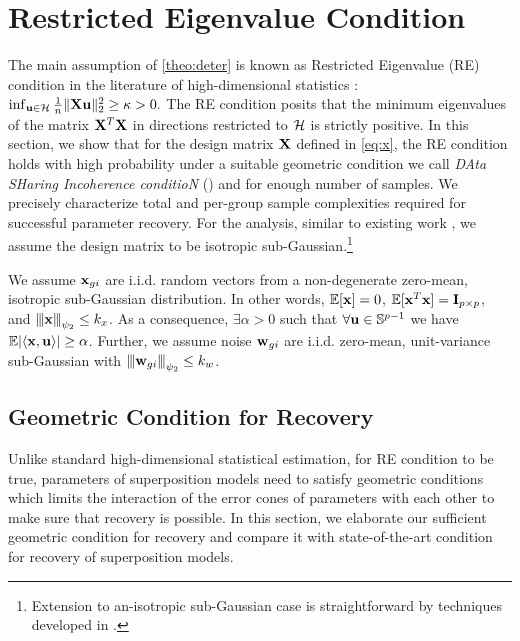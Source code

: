 \section{Restricted Eigenvalue Condition}
\label{sec:re}
The main assumption of \cref{theo:deter} is known as Restricted Eigenvalue (RE) condition in the literature of high-dimensional statistics \cite{banerjee14, nrwy12, raskutti10}:
$\inf_{\u \in \cH} \frac{1}{n} \norm{\X \u}{2}^2 \geq \kappa > 0.$
The RE condition posits that the minimum eigenvalues of the matrix $\mathbf{X}^T \mathbf{X}$ in directions restricted to $\cH$ is strictly positive.
In this section, we show that for the design matrix $\mathbf{X}$ defined in \cref{eq:x}, the RE condition holds with high probability under a suitable geometric condition we call {\em DAta SHaring Incoherence conditioN} (\ds) and for enough number of samples.
We precisely characterize total and per-group sample complexities required for successful parameter recovery.
For the analysis, similar to existing work \cite{guba16, mend15, trop15}, we assume the design matrix to be isotropic sub-Gaussian.\footnote{Extension to an-isotropic sub-Gaussian case is straightforward by techniques developed in \cite{banerjee14, ruzh13}.}
\begin{definition}
	\label{def:obs}
	We assume $\mathbf{x}_{gi}$ are i.i.d. random vectors from a non-degenerate zero-mean, isotropic sub-Gaussian distribution. In other words, $\mathbb{E} [\mathbf{x}] = 0$, $\mathbb{E} [\mathbf{x}^T \mathbf{x}] = \mathbf{I}_{p \times p}$, and ${\left\vert\kern-0.25ex\left\vert\kern-0.25ex\left\vert \mathbf{x} \right\vert\kern-0.25ex\right\vert\kern-0.25ex\right\vert}_{\psi_2} \leq k_x$.	
As a consequence, $\exists \alpha > 0$ such that $\forall \mathbf{u} \in \mathbb S^{p-1}$ we have $ \mathbb{E}|\langle \mathbf{x}, \mathbf{u} \rangle| \geq \alpha$. Further, we assume noise $\mathbf{w}_{gi} $ are i.i.d.
zero-mean, unit-variance sub-Gaussian with ${\left\vert\kern-0.25ex\left\vert\kern-0.25ex\left\vert \mathbf{w}_{gi} \right\vert\kern-0.25ex\right\vert\kern-0.25ex\right\vert}_{\psi_2} \leq k_w$.
\end{definition}

\subsection{Geometric Condition for Recovery}
Unlike standard high-dimensional statistical estimation, for RE condition to be true, parameters of superposition models need to satisfy geometric conditions which limits the interaction of the error cones of parameters with each other to make sure that recovery is possible. In this section, we elaborate our sufficient geometric condition for recovery and compare it with state-of-the-art condition for recovery of superposition models. 

